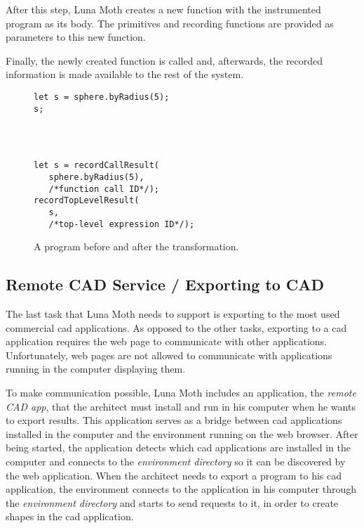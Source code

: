 After this step, Luna Moth creates a new function with the instrumented program as its body.
The primitives and recording functions are provided as parameters to this new function.

Finally, the newly created function is called and, afterwards, the recorded information is made available to the rest of the system.

\begin{figure}
  \centering
\begin{minipage}[t]{1.0\linewidth}
  \begin{verbatim}
let s = sphere.byRadius(5);
s;




  \end{verbatim}
\end{minipage}
\center{\rule{0.8\linewidth}{0.4pt}}
\begin{minipage}[t]{1.0\linewidth}
  \begin{verbatim}
let s = recordCallResult(
   sphere.byRadius(5),
   /*function call ID*/);
recordTopLevelResult(
   s,
   /*top-level expression ID*/);
  \end{verbatim}
\end{minipage}
  \caption{A program before and after the transformation.}
  \label{fig:instrument:example}
\end{figure}


\subsection{Remote CAD Service / Exporting to CAD}
The last task that Luna Moth needs to support is exporting to the most used commercial \gls{cad} applications.
As opposed to the other tasks, exporting to a \gls{cad} application requires the web page to communicate with other applications.
Unfortunately, web pages are not allowed to communicate with applications running in the computer displaying them.

To make communication possible, Luna Moth includes an application, the \textit{remote CAD app}, that the architect must install and run in his computer when he wants to export results.
This application serves as a bridge between \gls{cad} applications installed in the computer and the environment running on the web browser.
After being started, the application detects which \gls{cad} applications are installed in the computer and connects to the \textit{environment directory} so it can be discovered by the web application.
When the architect needs to export a program to his \gls{cad} application, the environment connects to the application in his computer through the \textit{environment directory} and starts to send requests to it, in order to create shapes in the \gls{cad} application.

